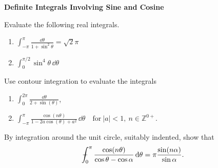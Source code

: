 {\begin{Exercise}
\end{Exercise}







\begin{large}
  \noindent
  \textbf{Definite Integrals Involving Sine and Cosine}
\end{large}





\begin{Exercise}
  \label{exercise dq 1+sin2 q}
  Evaluate the following real integrals.
  \begin{enumerate}
  \item 
    $\displaystyle \int_{-\pi}^\pi \frac{\dd \theta}{1 + \sin^2\theta} = \sqrt{2} \pi$
  \item 
    $\displaystyle \int_0^{\pi/2} \sin^4 \theta\,\dd \theta$
  \end{enumerate}

\end{Exercise}





\begin{Exercise}
  \label{exercise 1/(2 + sin theta)}
  Use contour integration to evaluate the integrals
  \begin{enumerate}
  \item $\displaystyle \int_0^{2\pi}\frac{\dd\theta}{2+\sin(\theta)}$,
  \item $\displaystyle \int_{-\pi}^{\pi}\frac{\cos(n\theta)}{1-2a\cos(\theta)+a^2}
    \,\dd \theta \quad \mathrm{for}\ |a|<1,\ n \in \mathbb{Z}^{0+}.$
  \end{enumerate}

\end{Exercise}



\begin{Exercise}
  \label{exercise cos(n t)/(cos t - cos a)}
  By integration around the unit circle, suitably indented, show that
  \[
  - \negthickspace \negthickspace \negthickspace \negmedspace\int_0^\pi \frac{ \cos(n \theta) }{ \cos \theta - \cos \alpha }
  \,\mathrm{d} \theta = \pi \frac{ \sin(n \alpha) }{ \sin \alpha }.
  \]


\end{Exercise}}
